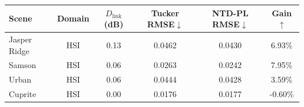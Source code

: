 \begin{tabular}{@{}l c c c c c@{}}
\toprule
Scene & Domain & \(D_{\mathrm{link}}\) (dB) & Tucker RMSE\(\downarrow\) & NTD-PL RMSE\(\downarrow\) & Gain\(\uparrow\) \\
\midrule
Jasper Ridge & HSI & 0.13 & 0.0462 & 0.0430 & 6.93\% \\
Samson & HSI & 0.06 & 0.0263 & 0.0242 & 7.95\% \\
Urban & HSI & 0.06 & 0.0444 & 0.0428 & 3.59\% \\
Cuprite & HSI & 0.00 & 0.0176 & 0.0177 & -0.60\% \\
\bottomrule
\end{tabular}
